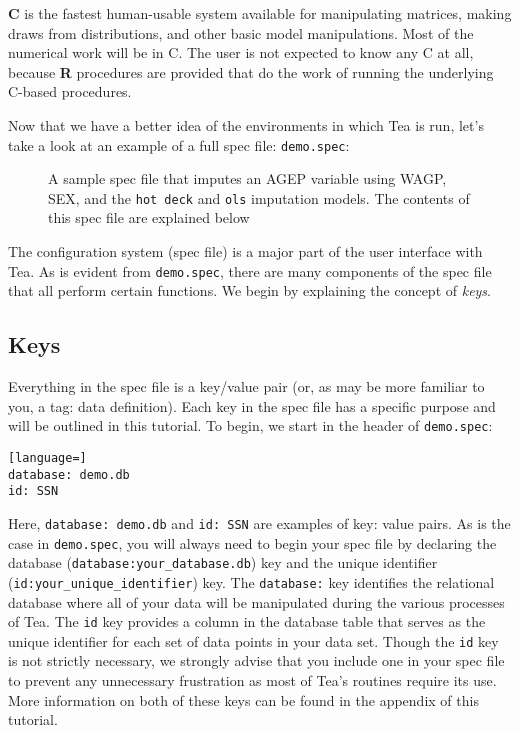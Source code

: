 \documentclass{article}
\begin{document}
{\bf C} is the fastest human-usable system available for manipulating matrices, making
draws from distributions, and other basic model manipulations. Most of the numerical
work will be in C. The user is not expected to know any C at all, because \textbf{R} procedures
are provided that do the work of running the underlying C-based procedures.

Now that we have a better idea of the environments in which Tea is run, let's take a look  
at an example of a full spec file: {\tt demo.spec}:


\begin{figure}
\lstset{columns=fullflexible}

\caption{A sample spec file that imputes an AGEP variable using WAGP, SEX, 
and the {\tt hot deck} and {\tt ols} imputation models. The contents of this spec 
file are explained below}
\end{figure}

The configuration system (spec file) is a major part of the user interface with Tea. As is evident 
from {\tt demo.spec}, there are many components of the spec file that all perform certain functions. 
We begin by explaining the concept of \textit{keys}.

\subsection{Keys}
Everything in the spec file is a key/value pair (or, as may be more familiar to 
you, a tag: data definition). Each key in the spec file has a specific purpose and 
will be outlined in this tutorial.
To begin, we start in the header of {\tt demo.spec}:

\begin{lstlisting}[language=]
database: demo.db
id: SSN
\end{lstlisting}

Here, {\tt database: demo.db} and {\tt id: SSN} are examples of key: value pairs.
As is the case in {\tt demo.spec}, you will always need to begin your spec file by declaring the 
database ({\tt database:your\_database.db}) key and the unique identifier 
({\tt id:your\_unique\_identifier}) key. The {\tt database:} key identifies 
the relational database where all of your data will be manipulated during the various processes of Tea. 
The {\tt id} key provides a column in the database table that serves as the unique identifier for 
each set of data points in your data set. Though the {\tt id} key is not strictly necessary, 
we strongly advise that you include one in your spec file to prevent any unnecessary frustration 
as most of Tea's routines require its use. More information on both of these keys can be found in 
the appendix of this tutorial.\\
\end{document}
